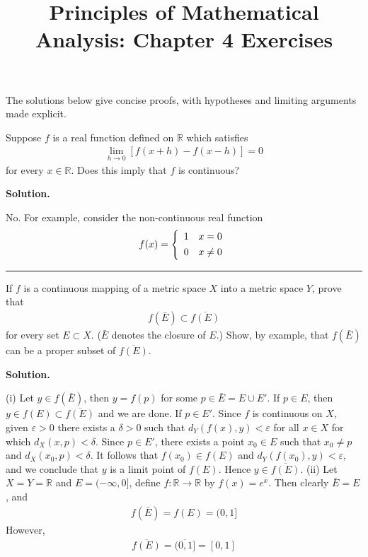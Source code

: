 \documentclass[12pt]{article}
\title{Principles of Mathematical Analysis: Chapter 4 Exercises}
\date{}
\theoremstyle{definition}
\begin{document}
\maketitle
\noindent The solutions below give concise proofs, with hypotheses and limiting arguments made explicit.

Suppose $f$ is a real function defined on $\mathbb{R}$ which satisfies
\begin{align*}
\lim_{h\to 0}\left[f(x+h)-f(x-h)\right]=0
\end{align*}
for every $x\in \mathbb{R}$. Does this imply that $f$ is continuous?

\smallskip
\noindent\textbf{Solution.}\quad

No. For example, consider the non-continuous real function
\begin{align*}
f(x)=\left\{\begin{array}{ll}
1&x=0 \vspace{0.05in}\\
0&x\ne 0
\end{array}\right.
\end{align*}



\bigskip\noindent\hrule\bigskip

If $f$ is a continuous mapping of a metric space $X$ into a metric space $Y$, prove that
\begin{align*}
f(\bar{E})\subset\overline{f(E)}
\end{align*}
for every set $E\subset X$. ($\bar{E}$ denotes the closure of $E$.) Show, by example, that $f(\bar{E})$ can be a proper subset of $\overline{f(E)}$.

\smallskip
\noindent\textbf{Solution.}\quad

(i) Let $y\in f(\bar{E})$, then $y=f(p)$ for some $p\in\bar{E}=E\cup E'$. If $p\in E$, then $y\in f(E)\subset\overline{f(E)}$ and we are done. If $p\in E'$. Since $f$ is continuous on $X$, given $\varepsilon>0$ there exists a $\delta>0$ such that $d_Y(f(x),y)<\varepsilon$ for all $x\in X$ for which $d_X(x,p)<\delta$. Since $p\in E'$, there exists a point $x_0\in E$ such that $x_0\ne p$ and $d_X(x_0,p)<\delta$. It follows that $f(x_0)\in f(E)$ and $d_Y(f(x_0),y)<\varepsilon$, and we conclude that $y$ is a limit point of $f(E)$. Hence $y\in\overline{f(E)}$.
(ii) Let $X=Y=\mathbb{R}$ and $E=(-\infty,0]$, define $f:\mathbb{R}\to \mathbb{R}$ by $f(x)=e^x$. Then clearly $\bar{E}=E$, and
\begin{align*}
f(\bar{E})=f(E)=(0,1]
\end{align*}
However,
\begin{align*}
\overline{f(E)}=\overline{(0,1]}=[0,1]
\end{align*}
\end{document}
